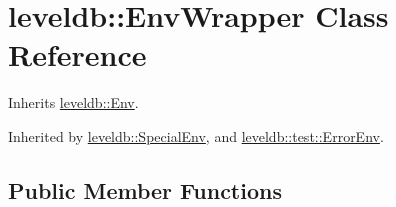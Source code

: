 \hypertarget{classleveldb_1_1_env_wrapper}{}\section{leveldb\+::Env\+Wrapper Class Reference}
\label{classleveldb_1_1_env_wrapper}


Inherits \mbox{\hyperlink{classleveldb_1_1_env}{leveldb\+::\+Env}}.



Inherited by \mbox{\hyperlink{classleveldb_1_1_special_env}{leveldb\+::\+Special\+Env}}, and \mbox{\hyperlink{classleveldb_1_1test_1_1_error_env}{leveldb\+::test\+::\+Error\+Env}}.

\subsection*{Public Member Functions}
